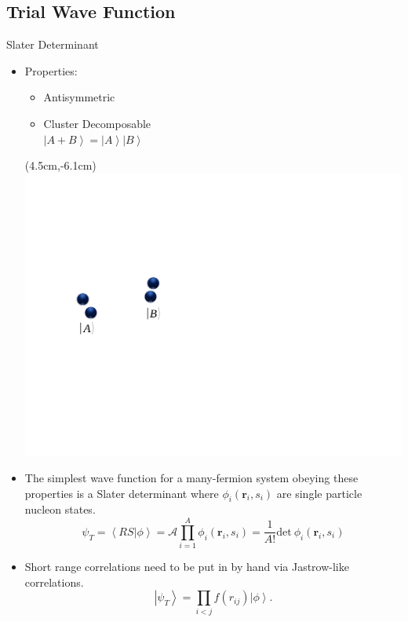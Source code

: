 \documentclass{beamer}
\newcommand{\ket}[1]{\left| #1 \right>}
\newcommand{\braket}[2]{\left< #1 | #2 \right>}
\begin{document}
\subsection{Trial Wave Function}
\begin{frame}{Slater Determinant}
\begin{itemize}
   \item Properties:
   \begin{itemize}
      \item Antisymmetric
      \item Cluster Decomposable \\ $\ket{A+B} = \ket{A}\ket{B}$
   \end{itemize}
   \begin{textblock*}{\textwidth}(4.5cm,-6.1cm) %
      \includegraphics[width=14.6cm]{../figures/cluster.pdf}
   \end{textblock*}
   \item The simplest wave function for a many-fermion system obeying these properties is a Slater determinant where $\phi_i(\mathbf{r}_i,s_i)$ are single particle nucleon states.
   \begin{equation*}
      \psi_{T} = \braket{RS}{\phi}= \mathcal{A} \prod\limits_{i=1}^A \phi_i(\mathbf{r}_i,s_i) = \frac{1}{A!} \mathrm{det}~\phi_i(\mathbf{r}_i,s_i)
   \end{equation*}
   \item Short range correlations need to be put in by hand via Jastrow-like correlations.
   \begin{equation*}
      \ket{\psi_T} = \prod\limits_{i<j}f(r_{ij}) \ket{\phi}.
   \end{equation*}
\end{itemize}
\end{frame}
\end{document}
